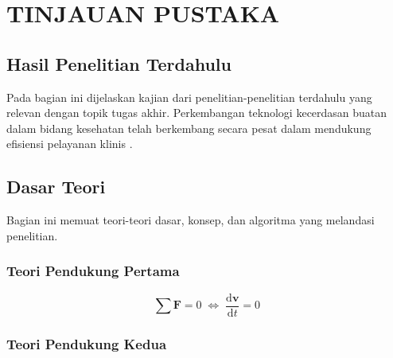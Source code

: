 \chapter{TINJAUAN PUSTAKA}
\label{chap:tinjauanpustaka}

\paragraphtextstyle

\section{Hasil Penelitian Terdahulu}
\label{sec:penelitianterdahulu}

Pada bagian ini dijelaskan kajian dari penelitian-penelitian terdahulu yang relevan dengan topik tugas akhir. Perkembangan teknologi kecerdasan buatan dalam bidang kesehatan telah berkembang secara pesat dalam mendukung efisiensi pelayanan klinis \parencite{rajpurkar2022ai}.

\lipsum[1]

\section{Dasar Teori}
\label{sec:dasarteori}

Bagian ini memuat teori-teori dasar, konsep, dan algoritma yang melandasi penelitian.

\subsection{Teori Pendukung Pertama}
\label{subsec:teoripertama}

\lipsum[2]

\begin{equation}
  \label{eq:persamaan1}
  \sum \mathbf{F} = 0\; \Leftrightarrow\; \frac{\mathrm{d} \mathbf{v} }{\mathrm{d}t} = 0
\end{equation}

\subsection{Teori Pendukung Kedua}
\label{subsec:teorikedua}

\lipsum[3]
